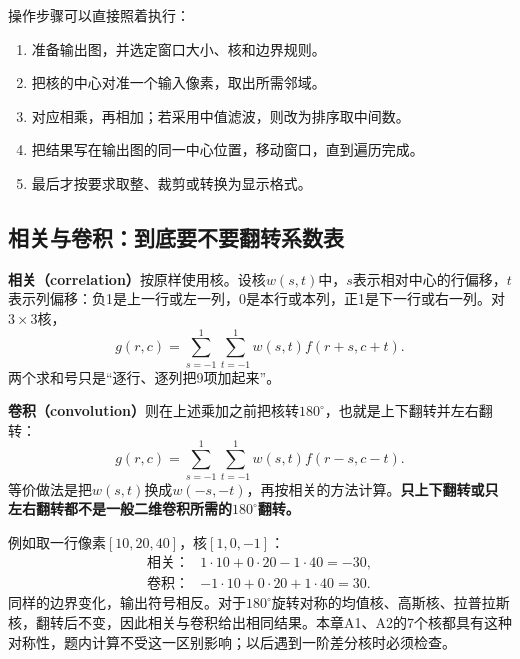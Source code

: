 操作步骤可以直接照着执行：
\begin{enumerate}[label=\arabic*.]
 \item 准备输出图，并选定窗口大小、核和边界规则。
 \item 把核的中心对准一个输入像素，取出所需邻域。
 \item 对应相乘，再相加；若采用中值滤波，则改为排序取中间数。
 \item 把结果写在输出图的同一中心位置，移动窗口，直到遍历完成。
 \item 最后才按要求取整、裁剪或转换为显示格式。
\end{enumerate}

\subsection{相关与卷积：到底要不要翻转系数表}
\textbf{相关（correlation）}按原样使用核。设核$w(s,t)$中，$s$表示相对中心的行偏移，$t$表示列偏移：负1是上一行或左一列，0是本行或本列，正1是下一行或右一列。对$3\times3$核，
\[
 g(r,c)=\sum_{s=-1}^{1}\sum_{t=-1}^{1}w(s,t)f(r+s,c+t).
\]
两个求和号只是“逐行、逐列把9项加起来”。

\textbf{卷积（convolution）}则在上述乘加之前把核转$180^\circ$，也就是上下翻转并左右翻转：
\[
 g(r,c)=\sum_{s=-1}^{1}\sum_{t=-1}^{1}w(s,t)f(r-s,c-t).
\]
等价做法是把$w(s,t)$换成$w(-s,-t)$，再按相关的方法计算。\textbf{只上下翻转或只左右翻转都不是一般二维卷积所需的$180^\circ$翻转。}

例如取一行像素$[10,20,40]$，核$[1,0,-1]$：
\[
 \begin{array}{ll}
 \text{相关：}&1\cdot10+0\cdot20-1\cdot40=-30,\\
 \text{卷积：}&-1\cdot10+0\cdot20+1\cdot40=30.
 \end{array}
\]
同样的边界变化，输出符号相反。对于$180^\circ$旋转对称的均值核、高斯核、拉普拉斯核，翻转后不变，因此相关与卷积给出相同结果。本章A1、A2的7个核都具有这种对称性，题内计算不受这一区别影响；以后遇到一阶差分核时必须检查。


